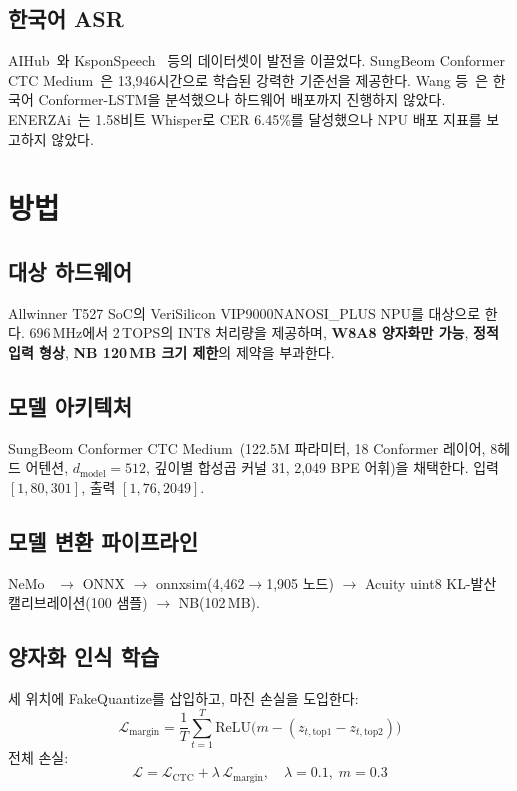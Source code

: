 \documentclass[a4paper,11pt,twocolumn]{article}
\begin{document}
\subsection{한국어 ASR}

AIHub~\cite{aihub}와 KsponSpeech~\cite{bang2020} 등의 데이터셋이 발전을 이끌었다. SungBeom Conformer CTC Medium~\cite{sungbeom}은 13,946시간으로 학습된 강력한 기준선을 제공한다. Wang 등~\cite{wang2023}은 한국어 Conformer-LSTM을 분석했으나 하드웨어 배포까지 진행하지 않았다. ENERZAi~\cite{enerzai2025}는 1.58비트 Whisper로 CER 6.45\%를 달성했으나 NPU 배포 지표를 보고하지 않았다.

\section{방법}

\subsection{대상 하드웨어}

Allwinner T527 SoC의 VeriSilicon VIP9000NANOSI\_PLUS NPU를 대상으로 한다. 696\,MHz에서 2\,TOPS의 INT8 처리량을 제공하며, \textbf{W8A8 양자화만 가능}, \textbf{정적 입력 형상}, \textbf{NB 120\,MB 크기 제한}의 제약을 부과한다.

\subsection{모델 아키텍처}

SungBeom Conformer CTC Medium~\cite{sungbeom}(122.5M 파라미터, 18 Conformer 레이어, 8헤드 어텐션, $d_\text{model}{=}512$, 깊이별 합성곱 커널 31, 2,049 BPE 어휘)을 채택한다. 입력 $[1, 80, 301]$, 출력 $[1, 76, 2049]$.

\subsection{모델 변환 파이프라인}

NeMo~\cite{nemo} $\rightarrow$ ONNX $\rightarrow$ onnxsim(4,462$\rightarrow$1,905 노드) $\rightarrow$ Acuity uint8 KL-발산 캘리브레이션(100 샘플) $\rightarrow$ NB(102\,MB).

\subsection{양자화 인식 학습}

세 위치에 FakeQuantize를 삽입하고, 마진 손실을 도입한다:
\begin{equation}
\mathcal{L}_{\text{margin}} = \frac{1}{T} \sum_{t=1}^{T} \text{ReLU}\big(m - (z_{t,\text{top1}} - z_{t,\text{top2}})\big)
\end{equation}
전체 손실:
\begin{equation}
\mathcal{L} = \mathcal{L}_{\text{CTC}} + \lambda \, \mathcal{L}_{\text{margin}}, \quad \lambda = 0.1, \; m = 0.3
\end{equation}
\end{document}
